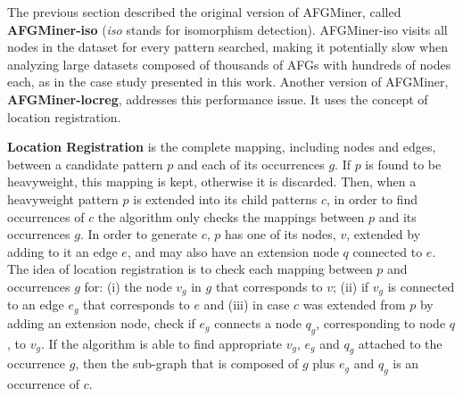 The previous section described the original version of AFGMiner, called {\bf AFGMiner-iso} (\emph{iso} stands for isomorphism detection). AFGMiner-iso visits all nodes in the dataset for every pattern searched, making it potentially slow when analyzing large datasets composed of thousands of AFGs with hundreds of nodes each, as in the case study presented in this work. Another version of AFGMiner, {\bf AFGMiner-locreg}, addresses this performance issue. It uses the concept of location registration.

{\bf Location Registration} is the complete mapping, including nodes and edges, between a candidate pattern $p$ and each of its occurrences $g$. If $p$ is found to be heavyweight, this mapping is kept, otherwise it is discarded. Then, when a heavyweight pattern $p$ is extended into its child patterns $c$, in order to find occurrences of $c$ the algorithm only checks the mappings between $p$ and its occurrences $g$. In order to generate $c$, $p$ has one of its nodes, $v$, extended by adding to it an edge $e$, and may also have an extension node $q$ connected to $e$. The idea of location registration is to check each mapping between $p$ and occurrences $g$ for: (i) the node $v_g$ in $g$ that corresponds to $v$; (ii) if $v_g$ is connected to an edge $e_g$ that corresponds to $e$ and (iii) in case $c$ was extended from $p$ by adding an extension node, check if $e_g$ connects a node $q_g$, corresponding to node $q$, to $v_g$. If the algorithm is able to find appropriate $v_g$, $e_g$ and $q_g$ attached to the occurrence $g$, then the sub-graph that is composed of $g$ plus $e_g$ and $q_g$ is an occurrence of $c$.







